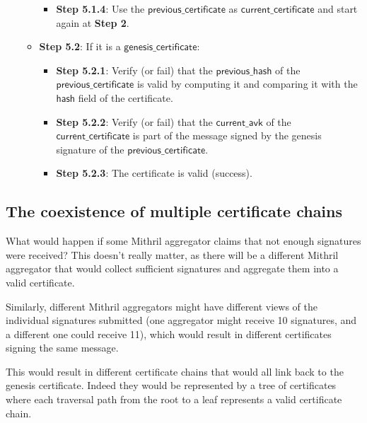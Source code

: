 \documentclass{article}
\begin{document}
\begin{itemize}
\begin{itemize}
\begin{itemize}
                \item \textbf{Step 5.1.4}: Use the $\mathsf{previous\_certificate}$ as $\mathsf{current\_certificate}$ and start again at \textbf{Step 2}.

                
            \end{itemize}

        \item \textbf{Step 5.2}: If it is a $\mathsf{genesis\_certificate}$:
            \begin{itemize}
                \item \textbf{Step 5.2.1}: Verify (or fail) that the $\mathsf{previous\_hash}$ of the $\mathsf{previous\_certificate}$ is valid by computing it and comparing it with the $\mathsf{hash}$ field of the certificate.
                \item \textbf{Step 5.2.2}: Verify (or fail) that the $\mathsf{current\_avk}$ of the $\mathsf{current\_certificate}$ is part of the message signed by the genesis signature of the $\mathsf{previous\_certificate}$.
                \item \textbf{Step 5.2.3}: The certificate is valid (success).
            \end{itemize}
        \end{itemize}
\end{itemize}

\subsection{The coexistence of multiple certificate chains}

What would happen if some Mithril aggregator claims that not enough signatures were received? This doesn’t really matter, as there will be a different Mithril aggregator that would collect sufficient signatures and aggregate them into a valid certificate.

Similarly, different Mithril aggregators might have different views of the individual signatures submitted (one aggregator might receive 10 signatures, and a different one could receive 11), which would result in different certificates signing the same message.

This would result in different certificate chains that would all link back to the genesis certificate. Indeed they would be represented by a tree of certificates where each traversal path from the root to a leaf represents a valid certificate chain.
\end{document}
